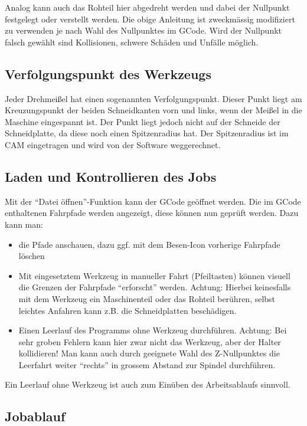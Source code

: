 \documentclass{\basedir/fablab-document}
\begin{document}
Analog kann auch das Rohteil hier abgedreht werden und dabei der Nullpunkt festgelegt oder verstellt werden. Die obige Anleitung ist zweckmässig modifiziert zu verwenden je nach Wahl des Nullpunktes im GCode. Wird der Nullpunkt falsch gewählt sind Kollisionen, schwere Schäden und Unfälle möglich.

\subsection{Verfolgungspunkt des Werkzeugs}
Jeder Drehmeißel hat einen sogenannten Verfolgungspunkt. Dieser Punkt liegt am Kreuzungspunkt der beiden Schneidkanten vorn und links, wenn der Meißel in die Maschine eingespannt ist. Der Punkt liegt jedoch nicht auf der Schneide der Schneidplatte, da diese noch einen Spitzenradius hat. Der Spitzenradius ist im CAM eingetragen und wird von der Software weggerechnet.

\subsection{Laden und Kontrollieren des Jobs}

Mit der \enquote{Datei öffnen}-Funktion kann der GCode geöffnet werden. Die im GCode enthaltenen Fahrpfade werden angezeigt, diese können nun geprüft werden. Dazu kann man:
\begin{itemize}
	\item die Pfade anschauen, dazu ggf. mit dem Besen-Icon vorherige Fahrpfade löschen
	\item Mit eingesetztem Werkzeug in manueller Fahrt (Pfeiltasten) können visuell die Grenzen der Fahrpfade \enquote{erforscht} werden. Achtung: Hierbei keinesfalls mit dem Werkzeug ein Maschinenteil oder das Rohteil berühren, selbst leichtes Anfahren kann z.B. die Schneidplatten beschädigen.
	\item Einen Leerlauf des Programms ohne Werkzeug durchführen. Achtung: Bei sehr groben Fehlern kann hier zwar nicht das Werkzeug, aber der Halter kollidieren! Man kann auch durch geeignete Wahl des Z-Nullpunktes die Leerfahrt weiter \enquote{rechts} in grossem Abstand zur Spindel durchführen.
\end{itemize}

Ein Leerlauf ohne Werkzeug ist auch zum Einüben des Arbeitsablaufs sinnvoll.

\subsection{Jobablauf}
\end{document}
